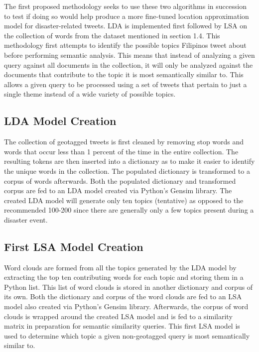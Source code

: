 The first proposed methodology seeks to use these two algorithms in succession to test if doing so would help produce a more fine-tuned location approximation model for disaster-related tweets. LDA is implemented first followed by LSA on the collection of words from the dataset mentioned in section 1.4. This methodology first attempts to identify the possible topics Filipinos tweet about before performing semantic analysis. This means that instead of analyzing a given query against all documents in the collection, it will only be analyzed against the documents that contribute to the topic it is most semantically similar to. This allows a given query to be processed using a set of tweets that pertain to just a single theme instead of a wide variety of possible topics. 

\subsection{LDA Model Creation}

The collection of geotagged tweets is first cleaned by removing stop words and words that occur less than 1 percent of the time in the entire collection. The resulting tokens are then inserted into a dictionary as to make it easier to identify the unique words in the collection. The populated dictionary is transformed to a corpus of words afterwards. Both the populated dictionary and transformed corpus are fed to an LDA model created via Python’s Gensim library. The created LDA model will generate only ten topics (tentative) as opposed to the recommended 100-200 since there are generally only a few topics present during a disaster event. 

\subsection{First LSA Model Creation}

Word clouds are formed from all the topics generated by the LDA model by extracting the top ten contributing words for each topic and storing them in a Python list. This list of word clouds is stored in another dictionary and corpus of its own. Both the dictionary and corpus of the word clouds are fed to an LSA model also created via Python’s Gensim library. Afterwards, the corpus of word clouds is wrapped around the created LSA model and is fed to a similarity matrix in preparation for semantic similarity queries. This first LSA model is used to determine which topic a given non-geotagged query is most semantically similar to.

